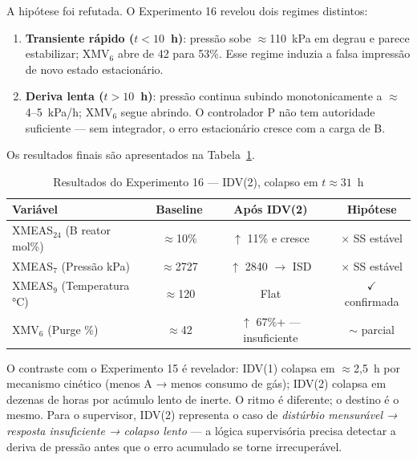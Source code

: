 A hipótese foi refutada. O Experimento 16 revelou dois regimes distintos:

\begin{enumerate}
  \item \textbf{Transiente rápido ($t < 10$~h)}: pressão sobe $\approx$110~kPa em degrau e parece estabilizar; XMV$_6$ abre de 42 para 53\%. Esse regime induzia a falsa impressão de novo estado estacionário.
  \item \textbf{Deriva lenta ($t > 10$~h)}: pressão continua subindo monotonicamente a $\approx$4–5~kPa/h; XMV$_6$ segue abrindo. O controlador P não tem autoridade suficiente — sem integrador, o erro estacionário cresce com a carga de B.
\end{enumerate}

Os resultados finais são apresentados na Tabela~\ref{tab:exp16}.

\begin{table}[ht!]
\centering
\caption{Resultados do Experimento 16 — IDV(2), colapso em $t \approx 31$~h}
\label{tab:exp16}
\begin{tabular}{|l|c|c|c|}
\hline
\textbf{Variável}              & \textbf{Baseline} & \textbf{Após IDV(2)} & \textbf{Hipótese} \\
\hline
XMEAS$_{24}$ (B reator mol\%)  & $\approx$10\%     & $\uparrow$ 11\% e cresce & $\times$ SS estável \\
XMEAS$_7$ (Pressão kPa)        & $\approx$2727     & $\uparrow$ 2840 $\to$ ISD & $\times$ SS estável \\
XMEAS$_9$ (Temperatura °C)     & $\approx$120      & Flat                     & $\checkmark$ confirmada \\
XMV$_6$ (Purge \%)             & $\approx$42       & $\uparrow$ 67\%+ — insuficiente & $\sim$ parcial \\
\hline
\end{tabular}
\end{table}


O contraste com o Experimento 15 é revelador: IDV(1) colapsa em $\approx$2,5~h por mecanismo cinético (menos A → menos consumo de gás); IDV(2) colapsa em dezenas de horas por acúmulo lento de inerte. O ritmo é diferente; o destino é o mesmo. Para o supervisor, IDV(2) representa o caso de \textit{distúrbio mensurável → resposta insuficiente → colapso lento} — a lógica supervisória precisa detectar a deriva de pressão antes que o erro acumulado se torne irrecuperável.

